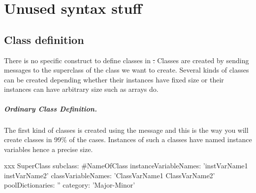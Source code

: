 \documentclass[a4paper,10pt,twoside]{book}
\begin{document}
	\renewcommand{\nnbb}[2]{} %
	\sloppy
\fi
\chapter{Unused syntax stuff}



\section{Class definition}


There is no specific construct to define classes in \st. Classes are created by sending messages to the 
superclass of the class we want to create.  Several kinds of classes can be created depending whether their
instances have fixed size  or their instances can have arbitrary size such as arrays do.

\paragraph{Ordinary Class Definition.} The first kind of classes is created using the message  and this is the way you will create classes in 99\% of the cases. Instances of such a classes have named instance variables hence a precise size. 

\begin{classdef}[xxx]{xxx}
SuperClass subclass: #NameOfClass
    instanceVariableNames: 'instVarName1 instVarName2'
    classVariableNames: 'ClassVarName1 ClassVarName2'
    poolDictionaries: ''
    category: 'Major-Minor'
\end{classdef}
\end{document}
